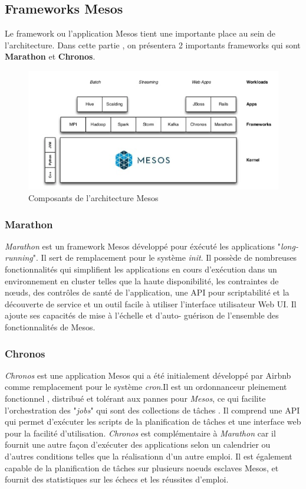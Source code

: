 \begin{onehalfspace}
\subsection{Frameworks Mesos}
Le framework ou l'application Mesos tient une importante place au sein de l'architecture. Dans cette partie , on présentera 2 importants frameworks qui sont \textbf{Marathon} et \textbf{Chronos}.
\begin{figure}[H]
\centering
\includegraphics [scale=0.65]{chapitre3/assets/framework.png}
\caption{Composants de l'architecture Mesos}
\end{figure}
\subsubsection{Marathon}
\emph{Marathon} est un framework Mesos développé pour éxécuté les applications "\emph{long-running}". Il sert de remplacement pour le système \emph{init}. Il possède de nombreuses fonctionnalités qui simplifient les applications en cours d'exécution dans un environnement en cluster telles que la haute disponibilité, les contraintes de nœuds, des contrôles de santé de l'application, une API pour scriptabilité et la découverte de service et un outil facile à utiliser l'interface utilisateur Web UI. Il ajoute ses capacités de mise à l'échelle et d'auto- guérison de l'ensemble des fonctionnalités de Mesos. 
\subsubsection{Chronos}
\emph{Chronos} est une application Mesos qui a été initialement développé par Airbnb comme remplacement pour le système \emph{cron}.Il est un ordonnanceur pleinement fonctionnel , distribué et tolérant aux pannes pour \emph{Mesos}, ce qui facilite l'orchestration des "\emph{jobs}" qui sont des collections de tâches . Il comprend une API qui permet d'exécuter les scripts de la planification de tâches et une interface web pour la facilité d'utilisation.
\emph{Chronos} est complémentaire à \emph{Marathon} car il fournit une autre façon d'exécuter des applications selon un calendrier ou d'autres conditions telles que la réalisationn d'un autre emploi. Il est également capable de la planification de tâches sur plusieurs noeuds esclaves Mesos, et fournit des statistiques sur les échecs et les réussites d'emploi.

\end{onehalfspace}
